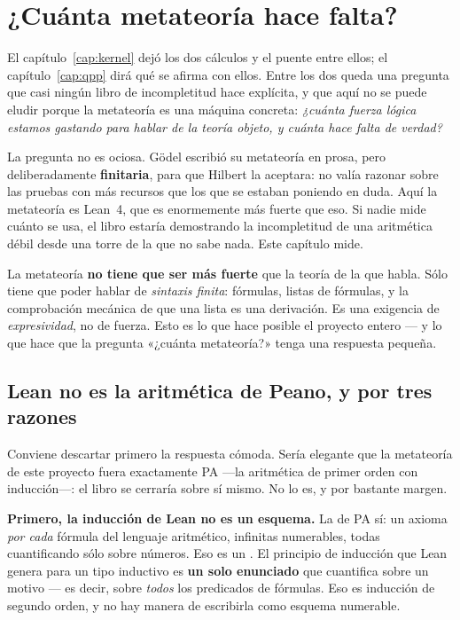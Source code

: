 \chapter{¿Cuánta metateoría hace falta?}
\label{cap:objeto-y-meta}

El capítulo~\ref{cap:kernel} dejó los dos cálculos y el puente entre ellos; el
capítulo~\ref{cap:qpp} dirá qué se afirma con ellos. Entre los dos queda una pregunta que casi
ningún libro de incompletitud hace explícita, y que aquí no se puede eludir porque la metateoría
es una máquina concreta: \emph{¿cuánta fuerza lógica estamos gastando para hablar de la teoría
objeto, y cuánta hace falta de verdad?}

La pregunta no es ociosa. Gödel escribió su metateoría en prosa, pero deliberadamente
\textbf{finitaria}, para que Hilbert la aceptara: no valía razonar sobre las pruebas con más
recursos que los que se estaban poniendo en duda. Aquí la metateoría es Lean~4, que es
enormemente más fuerte que eso. Si nadie mide cuánto se usa, el libro estaría demostrando la
incompletitud de una aritmética débil desde una torre de la que no sabe nada. Este capítulo mide.

\begin{leccion}
La metateoría \textbf{no tiene que ser más fuerte} que la teoría de la que habla. Sólo tiene que
poder hablar de \emph{sintaxis finita}: fórmulas, listas de fórmulas, y la comprobación mecánica de
que una lista es una derivación. Es una exigencia de \emph{expresividad}, no de fuerza. Esto es lo
que hace posible el proyecto entero — y lo que hace que la pregunta «¿cuánta metateoría?» tenga
una respuesta pequeña.
\end{leccion}

\section{Lean no es la aritmética de Peano, y por tres razones}

Conviene descartar primero la respuesta cómoda. Sería elegante que la metateoría de este proyecto
fuera exactamente PA —la aritmética de primer orden con inducción—: el libro se cerraría sobre sí
mismo. No lo es, y por bastante margen.

\textbf{Primero, la inducción de Lean no es un esquema.} La de PA sí: un axioma \emph{por cada}
fórmula del lenguaje aritmético, infinitas numerables, todas cuantificando sólo sobre números. Eso
es un . El principio de inducción que Lean genera
para un tipo inductivo es \textbf{un solo enunciado} que cuantifica sobre un motivo
 — es decir, sobre \emph{todos} los predicados de fórmulas. Eso es
inducción de segundo orden, y no hay manera de escribirla como esquema numerable.

